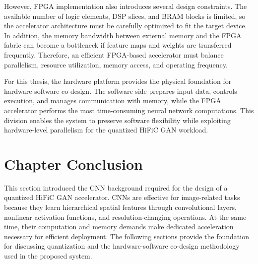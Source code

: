 \documentclass[11pt]{report}
\begin{document}
However, FPGA implementation also introduces several design constraints. The available number of logic elements, DSP slices, and BRAM blocks is limited, so the accelerator architecture must be carefully optimized to fit the target device. In addition, the memory bandwidth between external memory and the FPGA fabric can become a bottleneck if feature maps and weights are transferred frequently. Therefore, an efficient FPGA-based accelerator must balance parallelism, resource utilization, memory access, and operating frequency.

For this thesis, the hardware platform provides the physical foundation for hardware-software co-design. The software side prepares input data, controls execution, and manages communication with memory, while the FPGA accelerator performs the most time-consuming neural network computations. This division enables the system to preserve software flexibility while exploiting hardware-level parallelism for the quantized HiFiC GAN workload.

\section{Chapter Conclusion}

This section introduced the CNN background required for the design of a quantized HiFiC GAN accelerator. CNNs are effective for image-related tasks because they learn hierarchical spatial features through convolutional layers, nonlinear activation functions, and resolution-changing operations. At the same time, their computation and memory demands make dedicated acceleration necessary for efficient deployment. The following sections provide the foundation for discussing quantization and the hardware-software co-design methodology used in the proposed system.
\end{document}

